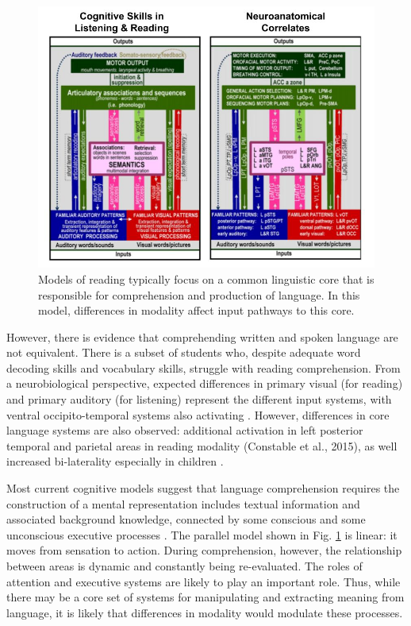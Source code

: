 \begin{figure}[tp]
	\centering
	\includegraphics[width=5in]{images/ch2-price-language-models.jpg}
	\caption[Schematics of skills and brain areas used in reading.]{Models of reading typically focus on a common linguistic core that is responsible for comprehension and production of language. In this model, differences in modality affect input pathways to this core.}
	\label{fig:ch2-price-language-models}
\end{figure}

However, there is evidence that comprehending written and spoken language are not equivalent. There is a subset of students who, despite adequate word decoding skills and vocabulary skills, struggle with reading comprehension\citep{Nation2010, Spencer2011}. From a neurobiological perspective, expected differences in primary visual (for reading) and primary auditory (for listening) represent the different input systems, with ventral occipito-temporal systems also activating \cite{Jobard2007}. However, differences in core language systems are also observed: additional activation in left posterior temporal and parietal areas in reading modality (Constable et al., 2015), as well increased bi-laterality especially in children \cite{Berl2010}. 

Most current cognitive models suggest that language comprehension requires the construction of a mental representation includes textual information and associated background knowledge, connected by some conscious and some unconscious executive processes \cite{Kendou2014}. The parallel model shown in Fig. \ref{fig:ch2-price-language-models} is linear: it moves from sensation to action. During comprehension, however, the relationship between areas is dynamic and constantly being re-evaluated. The roles of attention and executive systems are likely to play an important role. Thus, while there may be a core set of systems for manipulating and extracting meaning from language, it is likely that differences in modality would modulate these processes.

